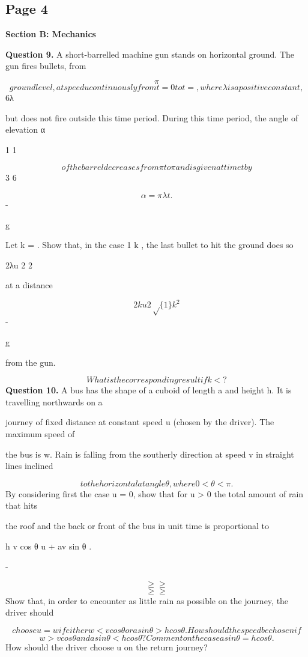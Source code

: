 \documentclass[12pt]{article}
\begin{document}
\subsection*{Page 4}
\begin{flushleft}
\bigskip\textbf{Section B: Mechanics}\par
\bigskip\textbf{Question 9.} A short-barrelled machine gun stands on horizontal ground. The gun fires bullets, from\par
\[\pi\]
\[ground level, at speed u continuously from t = 0 to t = , where λ is a positive constant,\]
6λ\par
but does not fire outside this time period. During this time period, the angle of elevation α\par
1 1\par
\[of the barrel decreases from \pi to \pi and is given at time t by\]
3 6\par
\[α = \pi λt .\]
-\par
g\par
Let k = . Show that, in the case 1 \geq k  , the last bullet to hit the ground does so\par
2λu 2 2\par
at a distance\par
\[2ku 2\sqrt\{1\} k^2\]
-\par
g\par
from the gun.\par
\[What is the corresponding result if k < ?\]
\bigskip\textbf{Question 10.} A bus has the shape of a cuboid of length a and height h. It is travelling northwards on a\par
journey of fixed distance at constant speed u (chosen by the driver). The maximum speed of\par
the bus is w. Rain is falling from the southerly direction at speed v in straight lines inclined\par
\[to the horizontal at angle θ, where 0 < θ < \pi.\]
By considering first the case u = 0, show that for u > 0 the total amount of rain that hits\par
the roof and the back or front of the bus in unit time is proportional to\par
h v cos θ u + av sin θ .\par
-\par
\[\geq \geq\]
\[\geq \geq\]
Show that, in order to encounter as little rain as possible on the journey, the driver should\par
\[choose u = w if either w < v cos θ or a sin θ > h cos θ. How should the speed be chosen if\]
\[w > v cos θ and a sin θ < h cos θ? Comment on the case a sin θ = h cos θ.\]
How should the driver choose u on the return journey?\par
\end{flushleft}
\end{document}
